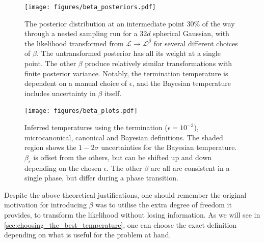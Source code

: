 \documentclass[usenatbib]{mnras}
\newcommand{\Like}{\mathcal{L}}
\begin{document}
\begin{figure}
\begin{center}
    \texttt{[image: figures/beta\_posteriors.pdf]}
\end{center}
\caption{The posterior distribution at an intermediate point 30\% of the way through a nested sampling run for a 32$d$ spherical Gaussian, with the likelihood transformed from  $\Like \to \Like^{\beta}$ for several different choices of $\beta$. The untransformed posterior has all its weight at a single point. The other $\beta$ produce relatively similar transformations with finite posterior variance. Notably, the termination temperature is dependent on a manual choice of $\epsilon$, and the Bayesian temperature includes uncertainty in $\beta$ itself.}
\label{fig:beta_posteriors}
\end{figure}

\begin{figure}
\begin{center}
    \texttt{[image: figures/beta\_plots.pdf]}
\end{center}
\caption{Inferred temperatures using the termination ($\epsilon = 10^{-3}$), microcanonical, canonical and Bayesian definitions. The shaded region shows the $1-2\sigma$ uncertainties for the Bayesian temperature. $\beta_\epsilon$ is offset from the others, but can be shifted up and down depending on the chosen $\epsilon$. The other $\beta$ are all are consistent in a single phase, but differ during a phase transition.}
\label{fig:beta_plots}
\end{figure}
Despite the above theoretical justifications, one should remember the original motivation for introducing $\beta$ was to utilise the extra degree of freedom it provides, to transform the likelihood without losing information. As we will see in \cref{sec:choosing_the_best_temperature}, one can choose the exact definition depending on what is useful for the problem at hand.
\end{document}
